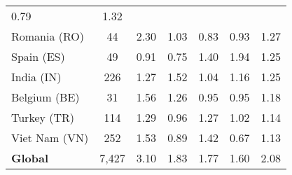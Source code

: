 \begin{table}[t]
{\begin{tabular}{lcccccc}
    \color{black} 0.79 & \color{black} 1.32 \\
    Romania (RO) & \color{black} 44 & {\cellcolor[HTML]{6AAED6}}
    \color[HTML]{F1F1F1} \color{black} 2.30 & {\cellcolor[HTML]{EAF2FB}}
    \color[HTML]{000000} \color{black} 1.03 & {\cellcolor[HTML]{F7FBFF}}
    \color[HTML]{000000} \color{black} 0.83 & {\cellcolor[HTML]{F1F7FD}}
    \color[HTML]{000000} \color{black} 0.93 & \color{black} 1.27 \\
    Spain (ES) & \color{black} 49 & {\cellcolor[HTML]{EAF2FB}} \color[HTML]{000000}
    \color{black} 0.91 & {\cellcolor[HTML]{F7FBFF}} \color[HTML]{000000}
    \color{black} 0.75 & {\cellcolor[HTML]{BFD8ED}} \color[HTML]{000000}
    \color{black} 1.40 & {\cellcolor[HTML]{6AAED6}} \color[HTML]{F1F1F1}
    \color{black} 1.94 & \color{black} 1.25 \\
    India (IN) & \color{black} 226 & {\cellcolor[HTML]{C8DCF0}}
    \color[HTML]{000000} \color{black} 1.27 & {\cellcolor[HTML]{6AAED6}}
    \color[HTML]{F1F1F1} \color{black} 1.52 & {\cellcolor[HTML]{F7FBFF}}
    \color[HTML]{000000} \color{black} 1.04 & {\cellcolor[HTML]{DFEBF7}}
    \color[HTML]{000000} \color{black} 1.16 & \color{black} 1.25 \\
    Belgium (BE) & \color{black} 31 & {\cellcolor[HTML]{6CAED6}}
    \color[HTML]{F1F1F1} \color{black} 1.56 & {\cellcolor[HTML]{C6DBEF}}
    \color[HTML]{000000} \color{black} 1.26 & {\cellcolor[HTML]{F7FBFF}}
    \color[HTML]{000000} \color{black} 0.95 & {\cellcolor[HTML]{F7FBFF}}
    \color[HTML]{000000} \color{black} 0.95 & \color{black} 1.18 \\
    Turkey (TR) & \color{black} 114 & {\cellcolor[HTML]{6CAED6}}
    \color[HTML]{F1F1F1} \color{black} 1.29 & {\cellcolor[HTML]{F7FBFF}}
    \color[HTML]{000000} \color{black} 0.96 & {\cellcolor[HTML]{7AB6D9}}
    \color[HTML]{000000} \color{black} 1.27 & {\cellcolor[HTML]{E3EEF9}}
    \color[HTML]{000000} \color{black} 1.02 & \color{black} 1.14 \\
    Viet Nam (VN) & \color{black} 252 & {\cellcolor[HTML]{6AAED6}}
    \color[HTML]{F1F1F1} \color{black} 1.53 & {\cellcolor[HTML]{DFEBF7}}
    \color[HTML]{000000} \color{black} 0.89 & {\cellcolor[HTML]{87BDDC}}
    \color[HTML]{000000} \color{black} 1.42 & {\cellcolor[HTML]{F7FBFF}}
    \color[HTML]{000000} \color{black} 0.67 & \color{black} 1.13 \\

    \midrule
    {\bf Global} & \color{black} 7,427 & {\cellcolor[HTML]{6AAED6}}
    \color[HTML]{F1F1F1} \color{black} 3.10 & {\cellcolor[HTML]{DCE9F6}}
    \color[HTML]{000000} \color{black} 1.83 & {\cellcolor[HTML]{F7FBFF}}
    \color[HTML]{000000} \color{black} 1.77 & {\cellcolor[HTML]{F7FBFF}}
    \color[HTML]{000000} \color{black} 1.60 & \color{black} 2.08 \\
    

\end{tabular}}
\end{table}

